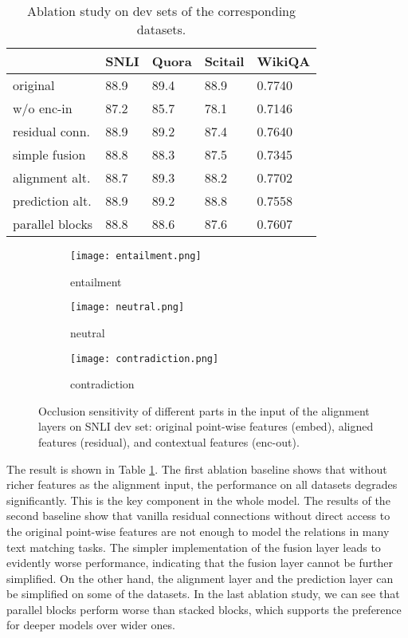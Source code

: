 \documentclass[11pt,a4paper]{article}
\begin{document}
\begin{table}
  \centering
  \small
  \begin{tabular}{|l|l|l|l|l|}
  \hline
    & {\bf SNLI} & {\bf Quora} & {\bf Scitail} & {\bf WikiQA}\\\hline
  original & 88.9 & 89.4 & 88.9 & 0.7740\\
  w/o enc-in & 87.2 & 85.7 & 78.1 & 0.7146 \\ 
  residual conn. & 88.9 & 89.2 & 87.4 & 0.7640  \\
  simple fusion & 88.8 & 88.3 & 87.5 &0.7345 \\
  alignment alt.& 88.7 & 89.3 & 88.2 & 0.7702 \\
  prediction alt.& 88.9 & 89.2 & 88.8 & 0.7558 \\
  parallel blocks & 88.8 & 88.6 & 87.6 &0.7607\\\hline
  \end{tabular}
  \caption{Ablation study on dev sets of the corresponding datasets.}\label{tab:ablation}
\end{table}

\begin{figure*}
  \centering
  \begin{subfigure}{.33\textwidth}
    \centering
    \texttt{[image: entailment.png]}
    \caption{entailment}
    \label{fig:entailment}
  \end{subfigure}\begin{subfigure}{.33\textwidth}
    \centering
    \texttt{[image: neutral.png]}
    \caption{neutral}
    \label{fig:neutral}
  \end{subfigure}
  \begin{subfigure}{.33\textwidth}
    \centering
    \texttt{[image: contradiction.png]}
    \caption{contradiction}
    \label{fig:contradiction}
  \end{subfigure}
  \caption{Occlusion sensitivity of different parts in the input of the alignment layers on SNLI dev set: original point-wise features (embed), aligned features (residual), and contextual features (enc-out).}
  \label{fig:occlusion}
\end{figure*}

The result is shown in Table \ref{tab:ablation}. The first ablation baseline shows that without richer features as the alignment input, the performance on all datasets degrades significantly. This is the key component in the whole model. The results of the second baseline show that vanilla residual connections without direct access to the original point-wise features are not enough to model the relations in many text matching tasks. The simpler implementation of the fusion layer leads to evidently worse performance, indicating that the fusion layer cannot be further simplified. On the other hand, the alignment layer and the prediction layer can be simplified on some of the datasets. In the last ablation study, we can see that parallel blocks perform worse than stacked blocks, which supports the preference for deeper models over wider ones.
\end{document}
